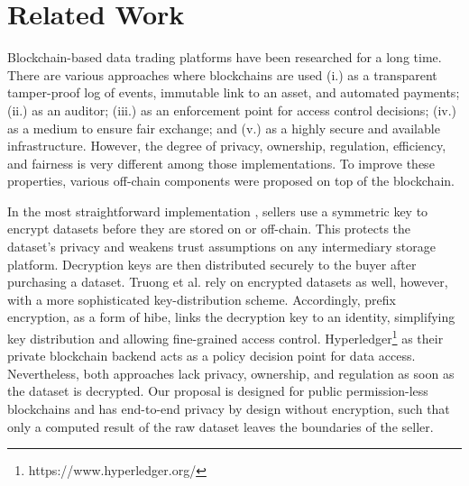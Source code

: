 \chapter{Related Work}
\label{cha:relatedwork}

Blockchain-based data trading platforms have been researched for a long time. There are various approaches where blockchains are used (i.) as a transparent tamper-proof log of events, immutable link to an asset, and automated payments; (ii.) as an auditor; (iii.) as an enforcement point for access control decisions; (iv.) as a medium to ensure fair exchange; and (v.) as a highly secure and available infrastructure. However, the degree of privacy, ownership, regulation, efficiency, and fairness is very different among those implementations. To improve these properties, various off-chain components were proposed on top of the blockchain.

In the most straightforward implementation \cite{ozyilmazIDMoBIoTData2018,banerjeeBlockchainEnabledData2019}, sellers use a symmetric key to encrypt datasets before they are stored on or off-chain. This protects the dataset's privacy and weakens trust assumptions on any intermediary storage platform. Decryption keys are then distributed securely to the buyer after purchasing a dataset. Truong et al. \cite{truongSecureDecentralizedSharing2019} rely on encrypted datasets as well, however, with a more sophisticated key-distribution scheme. Accordingly, prefix encryption, as a form of \acrfull{hibe}, links the decryption key to an identity, simplifying key distribution and allowing fine-grained access control. Hyperledger\footnote{https://www.hyperledger.org/} as their private blockchain backend acts as a policy decision point for data access. Nevertheless, both approaches lack privacy, ownership, and regulation as soon as the dataset is decrypted. Our proposal is designed for public permission-less blockchains and has end-to-end privacy by design without encryption, such that only a computed result of the raw dataset leaves the boundaries of the seller. 

